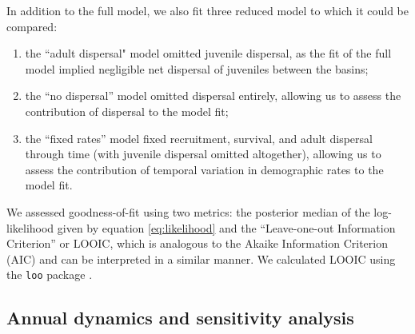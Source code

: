 \documentclass[11pt]{article}
\begin{document}
In addition to the full model, 
we also fit three reduced model to which it could be compared:
%
\begin{enumerate}[label=(\arabic*)]
\item
the ``adult dispersal" model omitted juvenile dispersal,
as the fit of the full model implied negligible net dispersal of juveniles between the basins;
%
\item
the ``no dispersal'' model omitted dispersal entirely,
allowing us to assess the contribution of dispersal to the model fit; 
%
\item
the ``fixed rates'' model fixed recruitment, survival, and adult dispersal through time
(with juvenile dispersal omitted altogether),
allowing us to assess the contribution of temporal variation in demographic rates
to the model fit. 
\end{enumerate}
%
We assessed goodness-of-fit using two metrics:
the posterior median of the log-likelihood given by equation \ref{eq:likelihood}
and the ``Leave-one-out Information Criterion'' or LOOIC,
which is analogous to the Akaike Information Criterion (AIC)
and can be interpreted in a similar manner.
We calculated LOOIC using the \texttt{loo} package \citep{loo}.





\subsection*{Annual dynamics and sensitivity analysis} 

\end{document}
